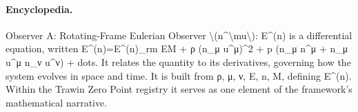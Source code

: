 \paragraph{Encyclopedia.}
Observer A: Rotating-Frame Eulerian Observer \textbackslash{}(n\textasciicircum{}\textbackslash{}mu\textbackslash{}): E\textasciicircum{}(n) is a differential equation, written E\textasciicircum{}(n)=E\textasciicircum{}(n)\_rm EM + ρ (n\_μ u\textasciicircum{}μ)\textasciicircum{}2 + p (n\_μ n\textasciicircum{}μ + n\_μ u\textasciicircum{}μ n\_ν u\textasciicircum{}ν) + dots. It relates the quantity to its derivatives, governing how the system evolves in space and time. It is built from ρ, μ, ν, E, n, M, defining E\textasciicircum{}(n). Within the Trawin Zero Point registry it serves as one element of the framework's mathematical narrative.
